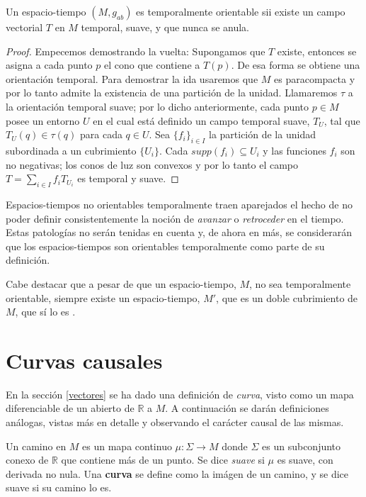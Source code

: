 \begin{lemma}\label{existencia camp vect temp no nulo}
Un espacio-tiempo $(M,g_{ab})$ es temporalmente orientable sii existe un campo vectorial $T$ en $M$ temporal, suave, y que nunca se anula.
\end{lemma}
\begin{proof}
Empecemos demostrando la vuelta: Supongamos que $T$ existe, entonces se asigna a cada punto $p$ el cono que contiene a $T(p)$. De esa forma se obtiene una orientación temporal. Para demostrar la ida usaremos que $M$ es paracompacta y por lo tanto admite la existencia de una partición de la unidad. Llamaremos $\tau$ a la orientación temporal suave; por lo dicho anteriormente, cada punto $p\in M$ posee un entorno $U$ en el cual está definido un campo temporal suave, $T_U$, tal que $T_U(q)\in \tau(q)$ para  cada $q\in U$. Sea $\{f_i\}_{i\in I}$ la partición de la unidad subordinada a un cubrimiento $\{U_i\}$. Cada $supp(f_i)\subseteq U_i$ y las funciones $f_i$ son no negativas; los conos de luz son convexos y por lo tanto el campo $T=\sum\limits_{i\in I}f_iT_{U_i}$ es temporal y suave.
\end{proof}

Espacios-tiempos no orientables temporalmente traen aparejados el hecho de no poder definir consistentemente la noción de \textit{avanzar} o \textit{retroceder} en el tiempo. Estas patologías no serán tenidas en cuenta y, de ahora en más, se considerarán que los espacios-tiempos son orientables temporalmente como parte de su definición.

Cabe destacar que a pesar de que un espacio-tiempo, $M$, no sea temporalmente orientable, siempre existe un espacio-tiempo, $M'$, que es un doble cubrimiento de $M$, que sí lo es \citep{Penrose}.







    
\section{Curvas causales}%

En la sección \ref{vectores} se ha dado una definición de \textit{curva}, visto como un mapa diferenciable de un abierto de $\mathbb{R}$ a $M$. A continuación se darán definiciones análogas, vistas más en detalle y observando el carácter causal de las mismas.

\begin{definition}
Un camino en $M$ es un mapa continuo $\mu:\Sigma \rightarrow M$ donde $\Sigma$ es un subconjunto conexo de $\mathbb{R}$ que contiene más de un punto. Se dice \textit{suave} si $\mu$ es suave, con derivada no nula. Una \textbf{curva} se define como la imágen de un camino, y se dice suave si su camino lo es. 
\end{definition}


